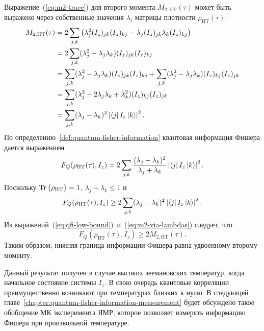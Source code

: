 %
Выражение~(\ref{eq:m2-trace}) для второго момента $M_{2,\mathrm{HT}}(\tau)$
может быть выражено через собственные значения $\lambda_i$ матрицы плотности $\rho_\mathrm{HT}(\tau)$:
%
\begin{equation}\label{eq:m2-via-lambdas}
\begin{split}
  M_{2,\mathrm{HT}}(\tau)
  &= 2 \sum_{j,k}\left( \lambda^2_j (I_z)_{jk} (I_z)_{kj} - \lambda_j (I_z)_{jk} \lambda_k (I_z)_{kj} \right)
  \\
  &= 2 \sum_{j,k} (\lambda^2_j - \lambda_j \lambda_k) (I_z)_{jk} (I_z)_{kj}
  \\
  &= \sum_{j,k} (\lambda^2_j - \lambda_j \lambda_k) (I_z)_{jk} (I_z)_{kj}
    + \sum_{j,k} (\lambda^2_j - \lambda_j \lambda_k) (I_z)_{kj} (I_z)_{jk}
  \\
  &= \sum_{j,k}
    (\lambda^2_j - 2\lambda_j \lambda_k + \lambda^2_k)
    (I_z)_{kj} (I_z)_{jk}
  \\
  &= \sum_{j,k}
    (\lambda_j - \lambda_k)^2
    \left| \left\langle j \right| I_z \left| k \right\rangle \right|^2.
\end{split}
\end{equation}
%
По определению~\ref{def:quantum-fisher-information} квантовая информация Фишера дается выражением
\begin{equation}
    F_Q(\rho_\mathrm{HT}(\tau), I_z) = 2\sum_{j,k} \frac{(\lambda_j - \lambda_k)^2}{\lambda_j + \lambda_k}
    \left| \left\langle j \right| I_z \left| k \right\rangle \right|^2.
\end{equation}
Поскольку $\mathrm{Tr} \left\{ \rho_\mathrm{HT} \right\} = 1$, $\lambda_j + \lambda_k \leq 1$ и
%
\begin{equation}\label{eq:qfi-low-bound}
  F_Q(\rho_\mathrm{HT}(\tau), I_z) \geq 2\sum_{j,k} (\lambda_j - \lambda_k)^2 \left| \left\langle j \right| I_z \left| k \right\rangle \right|^2.
\end{equation}
%
Из выражений~(\ref{eq:qfi-low-bound})~и~(\ref{eq:m2-via-lambdas}) следует, что
\begin{equation}
  F_Q(\rho_\mathrm{HT}(\tau), I_z) \geq 2 M_{2,\mathrm{HT}}(\tau).
\end{equation}
%
Таким образом, нижняя граница информации Фишера равна удвоенному второму моменту.

Данный результат получен в случае высоких зеемановских температур,
когда начальное состояние системы $I_z$.
В свою очередь квантовые корреляции преимущественно возникают при температурах близких к нулю.
В следующей главе~\ref{chapter:quantum-fisher-information-measurement}
будет обсуждено такое обобщение МК эксперимента ЯМР,
которое позволяет измерять информацию Фишера при произвольной температуре.
